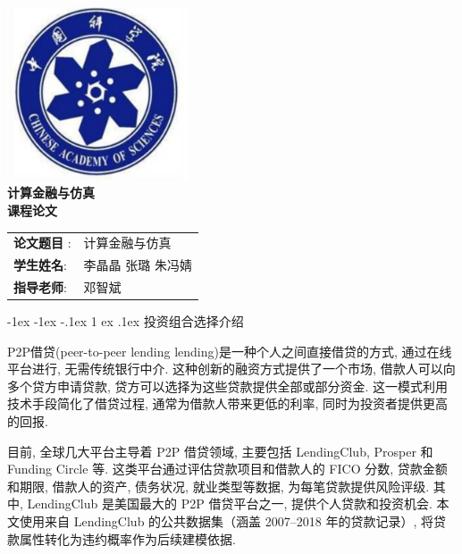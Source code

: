 \documentclass[12pt,nonblindrev]{write_paper}
\makeatletter
\renewcommand\section{\@startsection {section}{1}{\z@}%
                                   {-1ex \@plus -1ex \@minus -.1ex}%
                                   {1 ex \@plus.1ex}%
                                   {\normalfont\large\bfseries}}
\makeatother
\begin{document}
\vspace*{\fill}

\begin{center}

    \includegraphics[width=0.4\textwidth]{Figures/校徽.png}\\[1cm]
       \Huge \bfseries
       \textbf{计算金融与仿真}\\[0.5cm]
       \Huge \bfseries
       \textbf{课程论文}\\[2cm]
    
    \Large
    \begin{table}[htbp]
    \centering
    \Large
    \begin{tabular}{ll}
    \textbf{论文题目 }: & 计算金融与仿真 \\
    \textbf{学生姓名}: & 李晶晶 \quad 张璐 \quad 朱冯婧 \\
    \textbf{指导老师}: & 邓智斌 
    \end{tabular}
    \end{table}

    


\end{center}

\vspace*{\fill}
\newpage





\section{投资组合选择介绍}


P2P借贷(peer-to-peer lending lending)是一种个人之间直接借贷的方式, 通过在线平台进行, 无需传统银行中介. 这种创新的融资方式提供了一个市场, 借款人可以向多个贷方申请贷款, 贷方可以选择为这些贷款提供全部或部分资金. 这一模式利用技术手段简化了借贷过程, 通常为借款人带来更低的利率, 同时为投资者提供更高的回报. 

目前, 全球几大平台主导着 P2P 借贷领域, 主要包括 LendingClub, Prosper 和 Funding Circle 等. 这类平台通过评估贷款项目和借款人的 FICO 分数, 贷款金额和期限, 借款人的资产, 债务状况, 就业类型等数据, 为每笔贷款提供风险评级. 其中, LendingClub 是美国最大的 P2P 借贷平台之一, 提供个人贷款和投资机会. 本文使用来自 LendingClub 的公共数据集（涵盖 2007--2018 年的贷款记录）, 将贷款属性转化为违约概率作为后续建模依据. 
\end{document}
